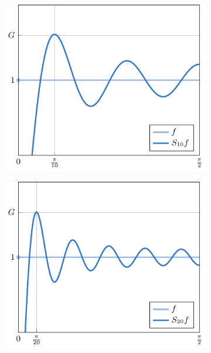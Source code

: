 \documentclass{beamer}
\begin{document}
\begin{frame}
    \begin{figure}[H]
    \centering
    \begin{subfigure}[b]{0.49\textwidth}
        \centering
        \includegraphics[scale = 0.58]{images/10.pdf}
    \end{subfigure}
    \begin{subfigure}[b]{0.49\textwidth}
        \centering
        \includegraphics[scale = 0.58]{images/11.pdf}
    \end{subfigure}
    \par\bigskip
    \begin{subfigure}[b]{0.49\textwidth}
        \centering

\end{subfigure}
\end{figure}
\end{frame}
\end{document}
